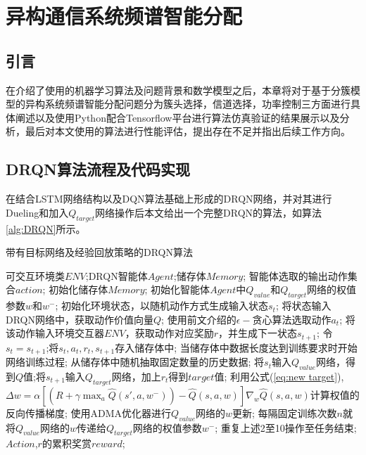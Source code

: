 \chapter{异构通信系统频谱智能分配}
\section{引言}
在介绍了使用的机器学习算法及问题背景和数学模型之后，本章将对于基于分簇模型的异构系统频谱智能分配问题分为簇头选择，信道选择，功率控制三方面进行具体阐述以及使用Python配合Tensorflow平台进行算法仿真验证的结果展示以及分析，最后对本文使用的算法进行性能评估，提出存在不足并指出后续工作方向。

\section{DRQN算法流程及代码实现}
在结合LSTM网络结构以及DQN算法基础上形成的DRQN网络，并对其进行Dueling和加入$Q_{target}$网络操作后本文给出一个完整DRQN的算法，如算法\ref{alg:DRQN}所示。
\begin{algorithm}[htb]  
	\caption{带有目标网络及经验回放策略的DRQN算法 }  
	\label{alg:DRQN}  
	 \begin{algorithmic}[1]  
		\Require  
		可交互环境类$ENV$;DRQN智能体$Agent$;储存体$Memory$;  
		\Ensure  
		智能体选取的输出动作集合$action$;  
		\State 初始化储存体$Memory$; 初始化智能体$Agent$中$Q_{value}$和$Q_{target}$网络的权值参数$w$和$w^{-}$;
		初始化环境状态，以随机动作方式生成输入状态$s_{t}$; 
		\State 将状态输入DRQN网络中，获取动作价值向量$Q$;  
		\State 使用前文介绍的$\epsilon -$贪心算法选取动作$a_{t}$; 
		\State 将该动作输入环境交互器$ENV$，获取动作对应奖励$r$，并生成下一状态$s_{t+1}$;
		\State 令$s_{t}=s_{t+1}$;将$s_{t},a_{t},r_{t},s_{t+1}$存入储存体中; 
		\State 当储存体中数据长度达到训练要求时开始网络训练过程; 从储存体中随机抽取固定数量的历史数据;  
		\State 将$s_{t}$输入$Q_{value}$网络，得到$Q$值;将$s_{t+1}$输入$Q_{target}$网络，加上$r_{t}$得到$target$值;
		\State 利用公式(\ref{eq:new target}),$\Delta w=\alpha\left [ \left ( R+\gamma\max _{a} \hat{Q}\left ( {s}' ,a,w^{-}\right )\right )- 	\hat{Q}\left ( s ,a,w\right )\right ]\nabla_{w}\hat{Q}\left ( s,a,w \right )$计算权值的反向传播梯度;
		\State 使用ADMA优化器进行$Q_{value}$网络的$w$更新;
		\State 每隔固定训练次数$n$就将$Q_{value}$网络的$w$传递给$Q_{target}$网络的权值参数$w^{-}$;
		\State 重复上述2至10操作至任务结束; \\
		\Return $Action$,$r$的累积奖赏$reward$;  
	\end{algorithmic}  
\end{algorithm}  

